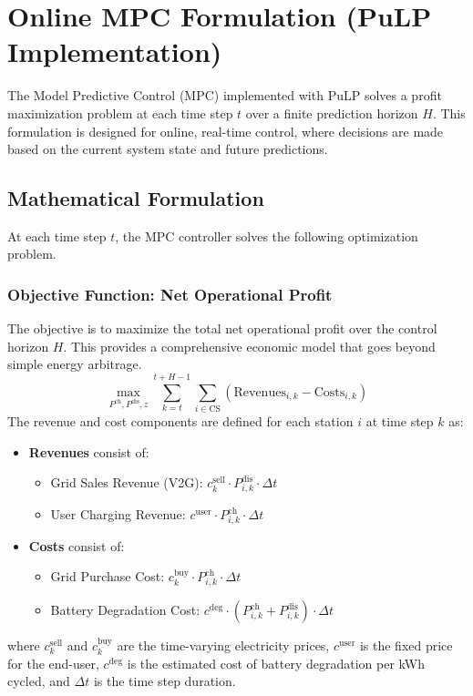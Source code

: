 \section{Online MPC Formulation (PuLP Implementation)}

The Model Predictive Control (MPC) implemented with PuLP solves a profit maximization problem at each time step $t$ over a finite prediction horizon $H$. This formulation is designed for online, real-time control, where decisions are made based on the current system state and future predictions.

\subsection{Mathematical Formulation}
At each time step $t$, the MPC controller solves the following optimization problem.

\subsubsection{Objective Function: Net Operational Profit}
The objective is to maximize the total net operational profit over the control horizon $H$. This provides a comprehensive economic model that goes beyond simple energy arbitrage.
\begin{equation}
\max_{P^{\text{ch}}, P^{\text{dis}}, z} \sum_{k=t}^{t+H-1} \sum_{i \in \text{CS}} \left( \text{Revenues}_{i,k} - \text{Costs}_{i,k} \right)
\end{equation}
The revenue and cost components are defined for each station $i$ at time step $k$ as:
\begin{itemize}
    \item \textbf{Revenues} consist of:
    \begin{itemize}
        \item Grid Sales Revenue (V2G): $c^{\text{sell}}_k \cdot P^{\text{dis}}_{i,k} \cdot \Delta t$
        \item User Charging Revenue: $c^{\text{user}} \cdot P^{\text{ch}}_{i,k} \cdot \Delta t$
    \end{itemize}
    \item \textbf{Costs} consist of:
    \begin{itemize}
        \item Grid Purchase Cost: $c^{\text{buy}}_k \cdot P^{\text{ch}}_{i,k} \cdot \Delta t$
        \item Battery Degradation Cost: $c^{\text{deg}} \cdot (P^{\text{ch}}_{i,k} + P^{\text{dis}}_{i,k}) \cdot \Delta t$
    \end{itemize}
\end{itemize}
where $c^{\text{sell}}_k$ and $c^{\text{buy}}_k$ are the time-varying electricity prices, $c^{\text{user}}$ is the fixed price for the end-user, $c^{\text{deg}}$ is the estimated cost of battery degradation per kWh cycled, and $\Delta t$ is the time step duration.

